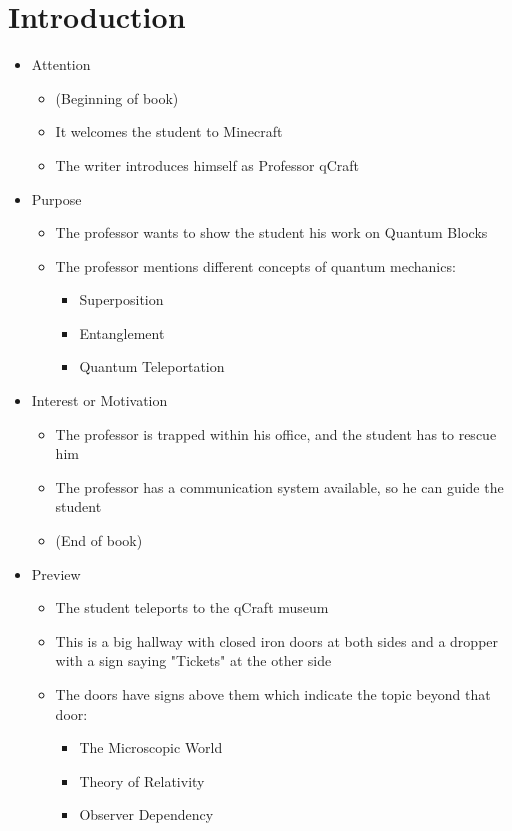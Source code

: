 \documentclass[11pt,twoside]{report} %
\begin{document}
\section{Introduction}

\begin{itemize}
	\item Attention
	\begin{itemize}
		\item (Beginning of book)
		\item It welcomes the student to Minecraft
		\item The writer introduces himself as Professor qCraft
	\end{itemize}
	\item Purpose
	\begin{itemize}
		\item The professor wants to show the student his work on Quantum Blocks
		\item The professor mentions different concepts of quantum mechanics:
		\begin{itemize}
			\item Superposition
			\item Entanglement
			\item Quantum Teleportation
		\end{itemize}
	\end{itemize}
	\item Interest or Motivation
	\begin{itemize}
		\item The professor is trapped within his office, and the student has to rescue him
		\item The professor has a communication system available, so he can guide the student
		\item (End of book)
	\end{itemize}
	\item Preview
	\begin{itemize}
		\item The student teleports to the qCraft museum
		\item This is a big hallway with closed iron doors at both sides and a dropper with a sign saying "Tickets" at the other side
		\item The doors have signs above them which indicate the topic beyond that door:
		\begin{itemize}
			\item The Microscopic World
			\item Theory of Relativity
			\item Observer Dependency

\end{itemize}
\end{itemize}
\end{itemize}
\end{document}
